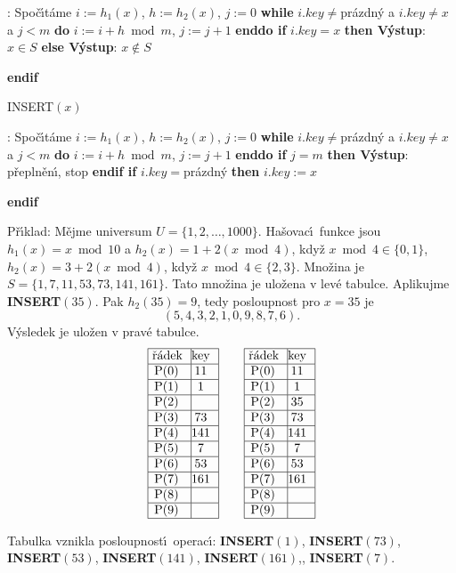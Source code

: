 :\newline 
Spo\v c\'\i t\'ame $i:=h_1(x)$, $h:=h_2(x)$, $j:=0$\newline 
{\bf while} $i.key\ne$pr\'azdn\'y a $i.key\ne x$ a $j<m$ {\bf do} $
i:=i+h\bmod m$, $j:=j+1$ {\bf enddo\newline 
if} $i.key=x$ {\bf then V\'ystup}: $x\in S$ {\bf else V\'ystup}: $
x\notin S$ {\bf endif
\medskip

\flushpar INSERT$(x)$}:\newline 
Spo\v c\'\i t\'ame $i:=h_1(x)$, $h:=h_2(x)$, $j:=0$\newline 
{\bf while} $i.key\ne$pr\'azdn\'y a $i.key\ne x$ a $j<m$ {\bf do} $
i:=i+h\bmod m$, $j:=j+1$ {\bf enddo\newline 
if} $j=m$ {\bf then V\'ystup}: p\v repln\v en\'\i , stop {\bf endif\newline 
if} $i.key=$pr\'azdn\'y {\bf then} $i.key:=x$ {\bf endif
\medskip

}\flushpar P\v r\'\i klad: M\v ejme universum $U=\{1,2,\dots,1000
\}$. 
Ha\v sovac\'\i\ funkce jsou 
$h_1(x)=x\bmod10$ a $h_2(x)=1+2(x\bmod4)$, kdy\v z 
$x\bmod4\in \{0,1\}$, $h_2(x)=3+2(x\bmod4)$, kdy\v z $x\bmod4\in 
\{2,3\}$. 
Mno\v zina je  $S=\{1,7,11,53,73,141,161\}$. Tato mno\v zina je ulo\v zena v 
lev\'e tabulce. Aplikujme {\bf INSERT$(35)$}. Pak $h_2(35)=9$, tedy 
posloupnost pro $x=35$ je 
$$(5,4,3,2,1,0,9,8,7,6).$$
V\'ysledek je ulo\v zen v prav\'e tabulce. 
$$\vbox {\hbox{\vtop{\offinterlineskip\halign{\strut\vrule\ # & \vrule\hfil# \hfil\vrule\cr\noalign{\hrule}\v r\'adek & key \hfil\cr\noalign{\hrule}P(0) & 11 \cr\noalign{\hrule}P(1) & 1 \cr\noalign{\hrule}P(2) & \hfill \cr\noalign{\hrule}P(3) & 73 \cr\noalign{\hrule}P(4) & 141 \cr\noalign{\hrule}P(5) & 7 \cr\noalign{\hrule}P(6) & 53 \cr\noalign{\hrule}P(7) & 161 \cr\noalign{\hrule}P(8) & \hfill\cr\noalign{\hrule}P(9) & \hfill \cr\noalign{\hrule}}}\qquad\vtop{\offinterlineskip\halign {\strut\vrule\ # & \vrule \hfil # \hfil \vrule\cr\noalign{\hrule}\v r\'adek & key \hfil \cr\noalign{\hrule}P(0) & 11 \cr\noalign{\hrule}P(1) & 1 \cr\noalign{\hrule}P(2) & 35 \cr\noalign{\hrule}P(3) & 73 \cr\noalign{\hrule}P(4) & 141 \cr\noalign{\hrule}P(5) & 7 \cr\noalign{\hrule}P(6) & 53 \cr\noalign{\hrule}P(7) & 161 \cr\noalign{\hrule}P(8) & \hfill \cr\noalign{\hrule}P(9) & \hfill \cr\noalign{\hrule}}}}}$$

\flushpar Tabulka vznikla posloupnost\'\i\ operac\'\i :\newline 
{\bf INSERT$(1)$}, {\bf INSERT$(73)$}, {\bf INSERT$(53)$}, 
{\bf INSERT$(141)$}, {\bf INSERT$(161)$},, {\bf INSERT$
(7)$}. 

